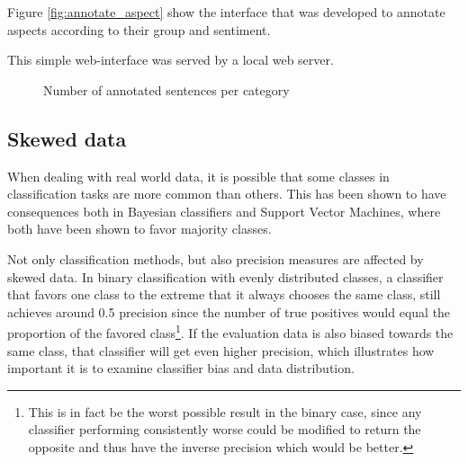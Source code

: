 \documentclass[a4paper,11pt]{kth-mag}
\begin{document}
Figure \ref{fig:annotate_aspect} show the interface that was developed to annotate aspects
according to their group and sentiment.

This simple web-interface was served by a local web server.

\begin{figure}[t]
  \centering
  \caption{Number of annotated sentences per category}
  \label{fig:cat_count}
\end{figure}

\clearpage


\subsection{Skewed data}
\label{subsec:bias}
When dealing with real world data, it is possible that some classes in classification tasks are more
common than others. This has been shown to have consequences both in Bayesian classifiers\cite{rennie2003bias}
and Support Vector Machines\cite{svm_bias}, where both have been shown to favor majority
classes\cite{rennie2003bias, svm_bias}.


Not only classification methods, but also precision measures are affected by skewed data. In binary
classification with evenly distributed classes, a classifier that favors one class to the extreme that it
always chooses the same class, still achieves around 0.5 precision since the number of true positives
would equal the proportion of the favored class\footnote{This is in fact be the worst possible result
in the binary case, since any classifier performing consistently worse could be modified to return the
opposite and thus have the inverse precision which would be better.}.
If the evaluation data is also biased towards the same class, that classifier will get even
higher precision, which illustrates how important it is to examine classifier
bias and data distribution.
\end{document}

